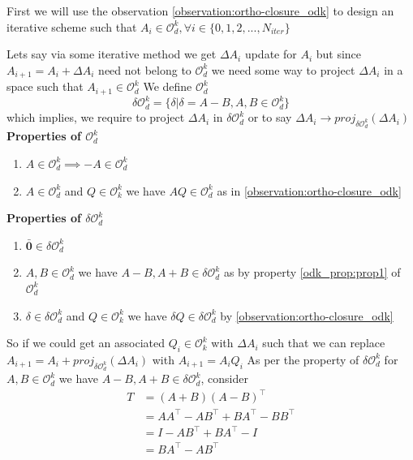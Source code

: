 First we will use the observation \ref{observation:ortho-closure_odk} to design an iterative scheme such that $A_i \in \mathcal{O}_d^k, \forall i \in \{0,1,2,...,N_{iter}\}$

Lets say via some iterative method we get $\Delta A_i$ update for $A_i$ but since $A_{i+1} = A_i + \Delta A_i$ need not belong to $\mathcal{O}_d^k$ we need some way to project $\Delta A_i$ in a space such that $A_{i+1} \in \mathcal{O}_d^k$
\newline We define $\mathcal{O}_d^k$
\begin{equation}
    \delta \mathcal{O}_d^k = \{ \delta | \delta = A - B, A, B \in \mathcal{O}_d^k \}
\end{equation}
which implies, we require to project $\Delta A_i$ in $\delta \mathcal{O}_d^k $ or to say $\Delta A_i \to proj_{\delta \mathcal{O}_d^k}(\Delta A_i)$
\newline \newline \textbf{Properties of $\mathcal{O}_d^k $}
\begin{enumerate}
    \item $A \in \mathcal{O}_d^k \implies -A \in \mathcal{O}_d^k$ \label{odk_prop:prop1}
    \item $A \in \mathcal{O}_d^k$ and $Q\in \mathcal{O}_k^k$ we have $A Q \in \mathcal{O}_d^k$ as in \ref{observation:ortho-closure_odk}
\end{enumerate}
\textbf{Properties of $\delta \mathcal{O}_d^k $}
\begin{enumerate}
    \item $\bar{\textbf{0}} \in \delta \mathcal{O}_d^k$
    \item $A, B \in \mathcal{O}_d^k$ we have $A-B, A+B \in \delta \mathcal{O}_d^k$ as by property \ref{odk_prop:prop1} of $\mathcal{O}_d^k$
    \item $\delta \in \delta \mathcal{O}_d^k$ and $Q\in \mathcal{O}_k^k$ we have $\delta Q \in \delta \mathcal{O}_d^k$ by \ref{observation:ortho-closure_odk}
\end{enumerate}
So if we could get an associated $Q_i \in \mathcal{O}_k^k$ with $\Delta A_i$ such that we can replace $A_{i+1} = A_i+proj_{\delta \mathcal{O}_d^k}(\Delta A_i)$ with $A_{i+1} = A_iQ_i$  
\newline As per the property of $\delta \mathcal{O}_d^k$ for $A, B \in \mathcal{O}_d^k$ we have $A-B, A+B \in \delta \mathcal{O}_d^k$, consider
\begin{equation}
\begin{aligned}
    T &= (A+B)(A-B)^\top \\
      &= AA^\top - AB^\top +BA^\top - BB^\top \\
      &= I - AB^\top +BA^\top - I \\
      &= BA^\top- AB^\top \\
\end{aligned}
\end{equation}
